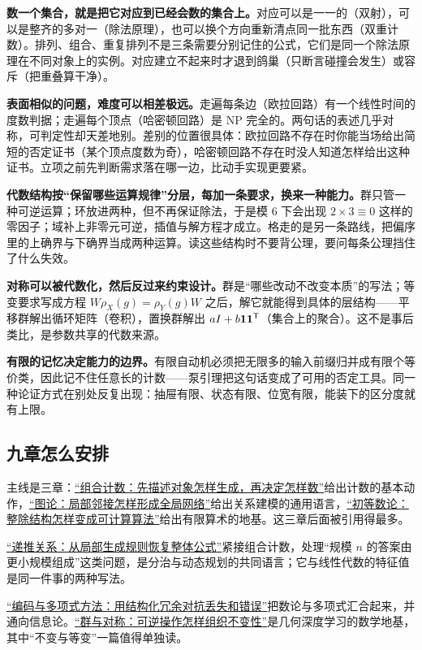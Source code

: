 \textbf{数一个集合，就是把它对应到已经会数的集合上。}对应可以是一一的（双射），可以是整齐的多对一（除法原理），也可以换个方向重新清点同一批东西（双重计数）。排列、组合、重复排列不是三条需要分别记住的公式，它们是同一个除法原理在不同对象上的实例。对应建立不起来时才退到鸽巢（只断言碰撞会发生）或容斥（把重叠算干净）。

\textbf{表面相似的问题，难度可以相差极远。}走遍每条边（欧拉回路）有一个线性时间的度数判据；走遍每个顶点（哈密顿回路）是 NP 完全的。两句话的表述几乎对称，可判定性却天差地别。差别的位置很具体：欧拉回路不存在时你能当场给出简短的否定证书（某个顶点度数为奇），哈密顿回路不存在时没人知道怎样给出这种证书。立项之前先判断需求落在哪一边，比动手实现更要紧。

\textbf{代数结构按``保留哪些运算规律''分层，每加一条要求，换来一种能力。}群只管一种可逆运算；环放进两种，但不再保证除法，于是模 6 下会出现 \(2\times3\equiv0\) 这样的零因子；域补上非零元可逆，插值与解方程才成立。格走的是另一条路线，把偏序里的上确界与下确界当成两种运算。读这些结构时不要背公理，要问每条公理挡住了什么失效。

\textbf{对称可以被代数化，然后反过来约束设计。}群是``哪些改动不改变本质''的写法；等变要求写成方程 \(W\rho_X(g)=\rho_Y(g)W\) 之后，解它就能得到具体的层结构——平移群解出循环矩阵（卷积），置换群解出 \(aI+b\mathbf{1}\mathbf{1}^{\mathsf{T}}\)（集合上的聚合）。这不是事后类比，是参数共享的代数来源。

\textbf{有限的记忆决定能力的边界。}有限自动机必须把无限多的输入前缀归并成有限个等价类，因此记不住任意长的计数——泵引理把这句话变成了可用的否定工具。同一种论证方式在别处反复出现：抽屉有限、状态有限、位宽有限，能装下的区分度就有上限。

\subsection{九章怎么安排}

主线是三章：\hyperref[ch:026]{``组合计数：先描述对象怎样生成，再决定怎样数''}给出计数的基本动作，\hyperref[ch:028]{``图论：局部邻接怎样形成全局网络''}给出关系建模的通用语言，\hyperref[ch:029]{``初等数论：整除结构怎样变成可计算算法''}给出有限算术的地基。这三章后面被引用得最多。

\hyperref[ch:027]{``递推关系：从局部生成规则恢复整体公式''}紧接组合计数，处理``规模 \(n\) 的答案由更小规模组成''这类问题，是分治与动态规划的共同语言；它与线性代数的特征值是同一件事的两种写法。

\hyperref[ch:031]{``编码与多项式方法：用结构化冗余对抗丢失和错误''}把数论与多项式汇合起来，并通向信息论。\hyperref[ch:032]{``群与对称：可逆操作怎样组织不变性''}是几何深度学习的数学地基，其中``不变与等变''一篇值得单独读。

